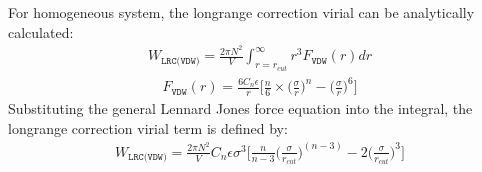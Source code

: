 \documentclass[letterpaper,10pt,english]{sphinxmanual}
\begin{document}
\begin{description}
\begin{equation*}
\end{equation*}
\item[{\sphinxcode{\sphinxupquote{Virial}}}] \leavevmode
For homogeneous system, the long\sphinxhyphen{}range correction virial can be analytically calculated:
\begin{equation*}
\begin{split}W_{\texttt{LRC(VDW)}} = \frac{2\pi N^2}{V} \int_{r=r_{cut}}^{\infty} r^3 F_{\texttt{VDW}}(r) dr\end{split}
\end{equation*}\begin{equation*}
\begin{split}F_{\texttt{VDW}}(r) = \frac{6C_{n} \epsilon}{r} \bigg[\frac{n}{6} \times \bigg(\frac{\sigma}{r}\bigg)^{n} - \bigg(\frac{\sigma}{r}\bigg)^6\bigg]\end{split}
\end{equation*}
Substituting the general Lennard Jones force equation into the integral, the long\sphinxhyphen{}range correction virial term is defined by:
\begin{equation*}
\begin{split}W_{\texttt{LRC(VDW)}} = \frac{2\pi N^2}{V} C_{n} \epsilon {\sigma}^3 \bigg[\frac{n}{n-3}\bigg(\frac{\sigma}{r_{cut}}\bigg)^{(n-3)} - 2 \bigg(\frac{\sigma}{r_{cut}}\bigg)^3\bigg]\end{split}
\end{equation*}
\end{description}
\end{document}
